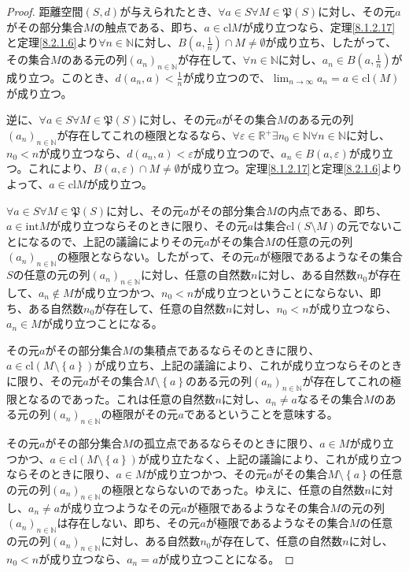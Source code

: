 \documentclass[dvipdfmx]{jsarticle}
\begin{document}
\begin{proof}
距離空間$(S,d)$が与えられたとき、$\forall a \in S\forall M \in \mathfrak{P}(S)$に対し、その元$a$がその部分集合$M$の触点である、即ち、$a \in {\mathrm{cl}}M$が成り立つなら、定理\ref{8.1.2.17}と定理\ref{8.2.1.6}より$\forall n \in \mathbb{N}$に対し、$B\left( a,\frac{1}{n} \right) \cap M \neq \emptyset$が成り立ち、したがって、その集合$M$のある元の列$\left( a_{n} \right)_{n \in \mathbb{N}}$が存在して、$\forall n \in \mathbb{N}$に対し、$a_{n} \in B\left( a,\frac{1}{n} \right)$が成り立つ。このとき、$d\left( a_{n},a \right) < \frac{1}{n}$が成り立つので、$\lim_{n \rightarrow \infty}a_{n} = a \in {\mathrm{cl}}(M)$が成り立つ。\par
逆に、$\forall a \in S\forall M \in \mathfrak{P}(S)$に対し、その元$a$がその集合$M$のある元の列$\left( a_{n} \right)_{n \in \mathbb{N}}$が存在してこれの極限となるなら、$\forall\varepsilon \in \mathbb{R}^{+}\exists n_{0} \in \mathbb{N}\forall n \in \mathbb{N}$に対し、$n_{0} < n$が成り立つなら、$d\left( a_{n},a \right) < \varepsilon$が成り立つので、$a_{n} \in B(a,\varepsilon)$が成り立つ。これにより、$B(a,\varepsilon) \cap M \neq \emptyset$が成り立つ。定理\ref{8.1.2.17}と定理\ref{8.2.1.6}よりよって、$a \in {\mathrm{cl}}M$が成り立つ。\par
$\forall a \in S\forall M \in \mathfrak{P}(S)$に対し、その元$a$がその部分集合$M$の内点である、即ち、$a \in {\mathrm{int}}M$が成り立つならそのときに限り、その元$a$は集合${\mathrm{cl}}(S \setminus M)$の元でないことになるので、上記の議論によりその元$a$がその集合$M$の任意の元の列$\left( a_{n} \right)_{n \in \mathbb{N}}$の極限とならない。したがって、その元$a$が極限であるようなその集合$S$の任意の元の列$\left( a_{n} \right)_{n \in \mathbb{N}}$に対し、任意の自然数$n$に対し、ある自然数$n_{0}$が存在して、$a_{n} \notin M$が成り立つかつ、$n_{0} < n$が成り立つということにならない、即ち、ある自然数$n_{0}$が存在して、任意の自然数$n$に対し、$n_{0} < n$が成り立つなら、$a_{n} \in M$が成り立つことになる。\par
その元$a$がその部分集合$M$の集積点であるならそのときに限り、$a \in {\mathrm{cl}}\left( M \setminus \left\{ a \right\} \right)$が成り立ち、上記の議論により、これが成り立つならそのときに限り、その元$a$がその集合$M \setminus \left\{ a \right\}$のある元の列$\left( a_{n} \right)_{n \in \mathbb{N}}$が存在してこれの極限となるのであった。これは任意の自然数$n$に対し、$a_{n} \neq a$なるその集合$M$のある元の列$\left( a_{n} \right)_{n \in \mathbb{N}}$の極限がその元$a$であるということを意味する。\par
その元$a$がその部分集合$M$の孤立点であるならそのときに限り、$a \in M$が成り立つかつ、$a \in {\mathrm{cl}}\left( M \setminus \left\{ a \right\} \right)$が成り立たなく、上記の議論により、これが成り立つならそのときに限り、$a \in M$が成り立つかつ、その元$a$がその集合$M \setminus \left\{ a \right\}$の任意の元の列$\left( a_{n} \right)_{n \in \mathbb{N}}$の極限とならないのであった。ゆえに、任意の自然数$n$に対し、$a_{n} \neq a$が成り立つようなその元$a$が極限であるようなその集合$M$の元の列$\left( a_{n} \right)_{n \in \mathbb{N}}$は存在しない、即ち、その元$a$が極限であるようなその集合$M$の任意の元の列$\left( a_{n} \right)_{n \in \mathbb{N}}$に対し、ある自然数$n_{0}$が存在して、任意の自然数$n$に対し、$n_{0} < n$が成り立つなら、$a_{n} = a$が成り立つことになる。
\end{proof}
\end{document}
